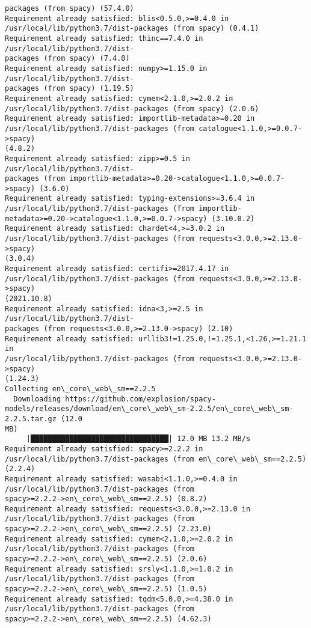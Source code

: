 \documentclass[11pt]{article}
\begin{document}
\begin{Verbatim}[commandchars=\\\{\}]
packages (from spacy) (57.4.0)
Requirement already satisfied: blis<0.5.0,>=0.4.0 in
/usr/local/lib/python3.7/dist-packages (from spacy) (0.4.1)
Requirement already satisfied: thinc==7.4.0 in /usr/local/lib/python3.7/dist-
packages (from spacy) (7.4.0)
Requirement already satisfied: numpy>=1.15.0 in /usr/local/lib/python3.7/dist-
packages (from spacy) (1.19.5)
Requirement already satisfied: cymem<2.1.0,>=2.0.2 in
/usr/local/lib/python3.7/dist-packages (from spacy) (2.0.6)
Requirement already satisfied: importlib-metadata>=0.20 in
/usr/local/lib/python3.7/dist-packages (from catalogue<1.1.0,>=0.0.7->spacy)
(4.8.2)
Requirement already satisfied: zipp>=0.5 in /usr/local/lib/python3.7/dist-
packages (from importlib-metadata>=0.20->catalogue<1.1.0,>=0.0.7->spacy) (3.6.0)
Requirement already satisfied: typing-extensions>=3.6.4 in
/usr/local/lib/python3.7/dist-packages (from importlib-
metadata>=0.20->catalogue<1.1.0,>=0.0.7->spacy) (3.10.0.2)
Requirement already satisfied: chardet<4,>=3.0.2 in
/usr/local/lib/python3.7/dist-packages (from requests<3.0.0,>=2.13.0->spacy)
(3.0.4)
Requirement already satisfied: certifi>=2017.4.17 in
/usr/local/lib/python3.7/dist-packages (from requests<3.0.0,>=2.13.0->spacy)
(2021.10.8)
Requirement already satisfied: idna<3,>=2.5 in /usr/local/lib/python3.7/dist-
packages (from requests<3.0.0,>=2.13.0->spacy) (2.10)
Requirement already satisfied: urllib3!=1.25.0,!=1.25.1,<1.26,>=1.21.1 in
/usr/local/lib/python3.7/dist-packages (from requests<3.0.0,>=2.13.0->spacy)
(1.24.3)
Collecting en\_core\_web\_sm==2.2.5
  Downloading https://github.com/explosion/spacy-
models/releases/download/en\_core\_web\_sm-2.2.5/en\_core\_web\_sm-2.2.5.tar.gz (12.0
MB)
     |████████████████████████████████| 12.0 MB 13.2 MB/s
Requirement already satisfied: spacy>=2.2.2 in
/usr/local/lib/python3.7/dist-packages (from en\_core\_web\_sm==2.2.5) (2.2.4)
Requirement already satisfied: wasabi<1.1.0,>=0.4.0 in
/usr/local/lib/python3.7/dist-packages (from
spacy>=2.2.2->en\_core\_web\_sm==2.2.5) (0.8.2)
Requirement already satisfied: requests<3.0.0,>=2.13.0 in
/usr/local/lib/python3.7/dist-packages (from
spacy>=2.2.2->en\_core\_web\_sm==2.2.5) (2.23.0)
Requirement already satisfied: cymem<2.1.0,>=2.0.2 in
/usr/local/lib/python3.7/dist-packages (from
spacy>=2.2.2->en\_core\_web\_sm==2.2.5) (2.0.6)
Requirement already satisfied: srsly<1.1.0,>=1.0.2 in
/usr/local/lib/python3.7/dist-packages (from
spacy>=2.2.2->en\_core\_web\_sm==2.2.5) (1.0.5)
Requirement already satisfied: tqdm<5.0.0,>=4.38.0 in
/usr/local/lib/python3.7/dist-packages (from
spacy>=2.2.2->en\_core\_web\_sm==2.2.5) (4.62.3)

\end{Verbatim}
\end{document}
